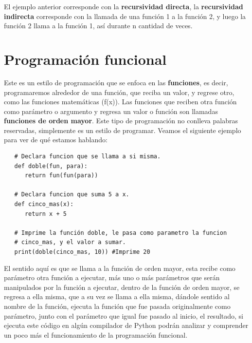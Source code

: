 El ejemplo anterior corresponde con la \textbf{recursividad directa}, la \textbf{recursividad indirecta} corresponde con la llamada de una función 1 a la función 2, y luego la función 2 llama a la función 1, así durante n cantidad de veces.



\section{Programación funcional}
\hspace{0.55cm}Este es un estilo de programación que se enfoca en las \textbf{funciones}, es decir, programaremos alrededor de una función, que reciba un valor, y regrese otro, como las funciones matemáticas (f(x)). Las funciones que reciben otra función como parámetro o argumento y regresa un valor o función son llamadas \textbf{funciones de orden mayor}. Este tipo de programación no conlleva palabras reservadas, simplemente es un estilo de programar. Veamos el siguiente ejemplo para ver de qué estamos hablando:
\begin{lstlisting}
   # Declara funcion que se llama a si misma.
   def doble(fun, para):
      return fun(fun(para))
      
   # Declara funcion que suma 5 a x.
   def cinco_mas(x):
      return x + 5
   
   # Imprime la función doble, le pasa como parametro la funcion
   # cinco_mas, y el valor a sumar.
   print(doble(cinco_mas, 10)) #Imprime 20
\end{lstlisting}

El sentido aquí es que se llama a la función de orden mayor, esta recibe como parámetro otra función a ejecutar, más uno o más parámetros que serán manipulados por la función a ejecutar, dentro de la función de orden mayor, se regresa a ella misma, que a su vez se llama a ella misma, dándole sentido al nombre de la función, ejecuta la función que fue pasada originalmente como parámetro, junto con el parámetro que igual fue pasado al inicio, el resultado, si ejecuta este código en algún compilador de Python podrán analizar y comprender un poco más el funcionamiento de la programación funcional.


